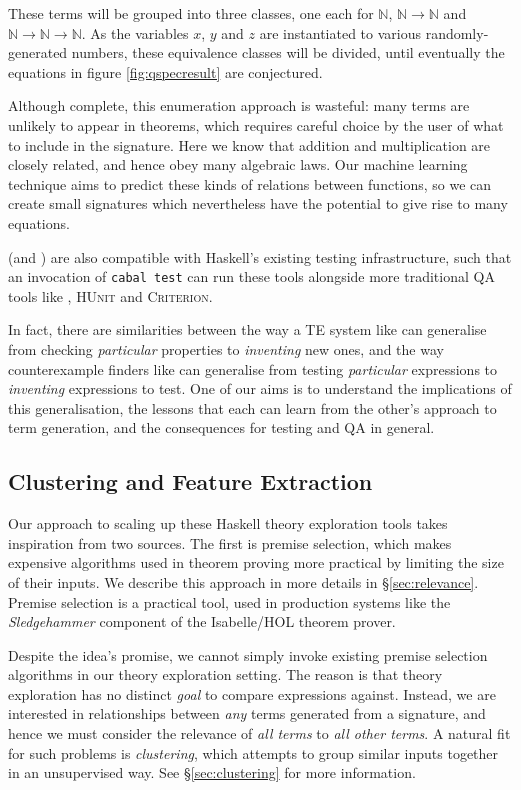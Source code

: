 These terms will be grouped into three classes, one each for $\mathbb{N}$, $\mathbb{N} \rightarrow \mathbb{N}$ and $\mathbb{N} \rightarrow \mathbb{N} \rightarrow \mathbb{N}$. As the variables $x$, $y$ and $z$ are instantiated to various randomly-generated numbers, these equivalence classes will be divided, until eventually the equations in figure \ref{fig:qspecresult} are conjectured.

Although complete, this enumeration approach is wasteful: many terms are unlikely to appear in theorems, which requires careful choice by the user of what to include in the signature. Here we know that addition and multiplication are closely related, and hence obey many algebraic laws. Our machine learning technique aims to predict these kinds of relations between functions, so we can create small signatures which nevertheless have the potential to give rise to many equations.

\qspec{} (and \hspec{}) are also compatible with Haskell's existing testing infrastructure, such that an invocation of \texttt{cabal test} can run these tools alongside more traditional QA tools like \qcheck{}, \textsc{HUnit} and \textsc{Criterion}.

In fact, there are similarities between the way a TE system like \qspec{} can generalise from checking \emph{particular} properties to \emph{inventing} new ones, and the way counterexample finders like \qcheck{} can generalise from testing \emph{particular} expressions to \emph{inventing} expressions to test. One of our aims is to understand the implications of this generalisation, the lessons that each can learn from the other's approach to term generation, and the consequences for testing and QA in general.

\subsection{Clustering and Feature Extraction}
\label{sec:featureextraction}

Our approach to scaling up these Haskell theory exploration tools takes inspiration from two sources. The first is premise selection, which makes expensive algorithms used in theorem proving more practical by limiting the size of their inputs. We describe this approach in more details in \S \ref{sec:relevance}. Premise selection is a practical tool, used in production systems like the \emph{Sledgehammer} component of the Isabelle/HOL theorem prover.

Despite the idea's promise, we cannot simply invoke existing premise selection algorithms in our theory exploration setting. The reason is that theory exploration has no distinct \emph{goal} to compare expressions against. Instead, we are interested in relationships between \emph{any} terms generated from a signature, and hence we must consider the relevance of \emph{all terms} to \emph{all other terms}. A natural fit for such problems is \emph{clustering}, which attempts to group similar inputs together in an unsupervised way. See \S \ref{sec:clustering} for more information.

